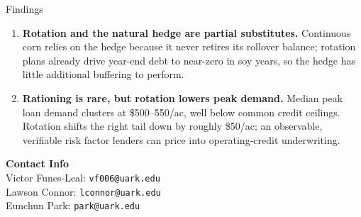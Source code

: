 \documentclass[final]{beamer}
\newlength{\onecolwid}
\begin{document}
\begin{frame}[t]
\begin{columns}[t]
\begin{column}{\onecolwid}
\begin{block}{Findings}
\begin{enumerate}
  \item \textbf{Rotation and the natural hedge are partial substitutes.}
  Continuous corn relies on the hedge because it never retires its rollover
  balance; rotation plans already drive year-end debt to near-zero in soy years,
  so the hedge has little additional buffering to perform.

  \item \textbf{Rationing is rare, but rotation lowers peak demand.} Median peak
  loan demand clusters at \$500--550/ac, well below common credit ceilings. Rotation
  shifts the right tail down by roughly \$50/ac; an observable, verifiable risk
  factor lenders can price into operating-credit underwriting.

\end{enumerate}
\end{block}

\begin{block}{}
\centering
\textbf{Contact Info}\\[0.5ex]
Victor Funes-Leal: \texttt{vf006@uark.edu}\\
Lawson Connor: \texttt{lconnor@uark.edu}\\
Eunchun Park: \texttt{park@uark.edu}
\end{block}

\end{column}

\end{columns}

\end{frame}
\end{document}
